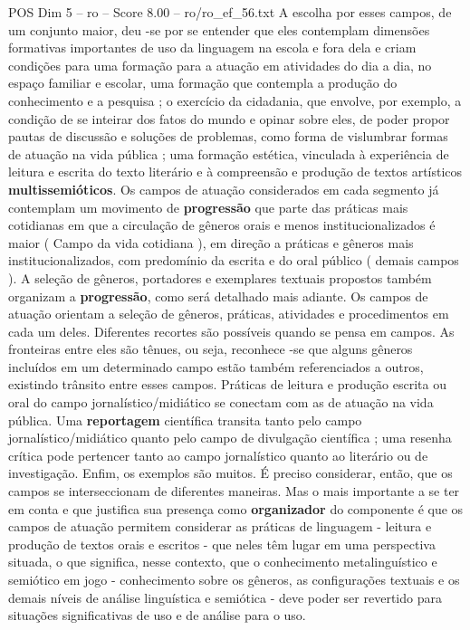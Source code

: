 \begin{textsample}{POS Dim 5 – ro – Score 8.00 – ro/ro\_ef\_56.txt}  \label{ex:f5_pos_118}
A escolha por esses campos, de um conjunto maior, deu -se por se entender que eles contemplam dimensões formativas importantes de uso da linguagem na escola e fora dela e criam condições para uma formação para a atuação em atividades do dia a dia, no espaço familiar e escolar, uma formação que contempla a produção do conhecimento e a pesquisa ; o exercício da cidadania, que envolve, por exemplo, a condição de se inteirar dos fatos do mundo e opinar sobre eles, de poder propor pautas de discussão e soluções de problemas, como forma de vislumbrar formas de atuação na vida pública ; uma formação estética, vinculada à experiência de leitura e escrita do texto literário e à compreensão e produção de textos artísticos \textbf{multissemióticos}.
Os campos de atuação considerados em cada segmento já contemplam um movimento de \textbf{progressão} que parte das práticas mais cotidianas em que a circulação de gêneros orais e menos institucionalizados é maior ( Campo da vida cotidiana ), em direção a práticas e gêneros mais institucionalizados, com predomínio da escrita e do oral público ( demais campos ).
A seleção de gêneros, portadores e exemplares textuais propostos também organizam a \textbf{progressão}, como será detalhado mais adiante.
Os campos de atuação orientam a seleção de gêneros, práticas, atividades e procedimentos em cada um deles.
Diferentes recortes são possíveis quando se pensa em campos.
As fronteiras entre eles são tênues, ou seja, reconhece -se que alguns gêneros incluídos em um determinado campo estão também referenciados a outros, existindo trânsito entre esses campos.
Práticas de leitura e produção escrita ou oral do campo jornalístico/midiático se conectam com as de atuação na vida pública.
Uma \textbf{reportagem} científica transita tanto pelo campo jornalístico/midiático quanto pelo campo de divulgação científica ; uma resenha crítica pode pertencer tanto ao campo jornalístico quanto ao literário ou de investigação.
Enfim, os exemplos são muitos.
É preciso considerar, então, que os campos se interseccionam de diferentes maneiras.
Mas o mais importante a se ter em conta e que justifica sua presença como \textbf{organizador} do componente é que os campos de atuação permitem considerar as práticas de linguagem - leitura e produção de textos orais e escritos - que neles têm lugar em uma perspectiva situada, o que significa, nesse contexto, que o conhecimento metalinguístico e semiótico em jogo - conhecimento sobre os gêneros, as configurações textuais e os demais níveis de análise linguística e semiótica - deve poder ser revertido para situações significativas de uso e de análise para o uso.

\end{textsample}

